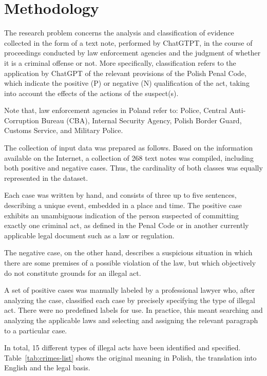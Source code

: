 \documentclass[preprint,12pt,number]{elsarticle}
\begin{document}
\section{Methodology}
\label{sec:methodology}

The research problem concerns the analysis and classification of evidence collected in the form of a text note, performed by ChatGTPT, in the course of proceedings conducted by law enforcement agencies and the judgment of whether it is a criminal offense or not. 
More specifically, classification refers to the application by ChatGPT of the relevant provisions of the Polish Penal Code, which indicate the positive (P) or negative (N) qualification of the act, taking into account the effects of the actions of the suspect(s).

Note that, law enforcement agencies in Poland refer to: Police, Central Anti-Corruption Bureau (CBA), Internal Security Agency, Polish Border Guard, Customs Service, and Military Police.

The collection of input data was prepared as follows. Based on the information available on the Internet, a collection of 268 text notes was compiled, including both positive and negative cases. Thus, the cardinality of both classes was equally represented in the dataset.

Each case was written by hand, and consists of three up to five sentences, describing a unique event, embedded in a place and time. The positive case exhibits an unambiguous indication of the person suspected of committing exactly one criminal act, as defined in the Penal Code or in another currently applicable legal document such as a law or regulation. 

The negative case, on the other hand, describes a suspicious situation in which there are some premises of a possible violation of the law, but which objectively do not constitute grounds for an illegal act.

A set of positive cases was manually labeled by a professional lawyer who, after analyzing the case, classified each case by precisely specifying the type of illegal act. There were no predefined labels for use. In practice, this meant searching and analyzing the applicable laws and selecting and assigning the relevant paragraph to a particular case. 

In total, 15 different types of illegal acts have been identified and specified. Table~\ref{tab:crimes-list} shows the original meaning in Polish, the translation into English and the legal basis. 
\end{document}
